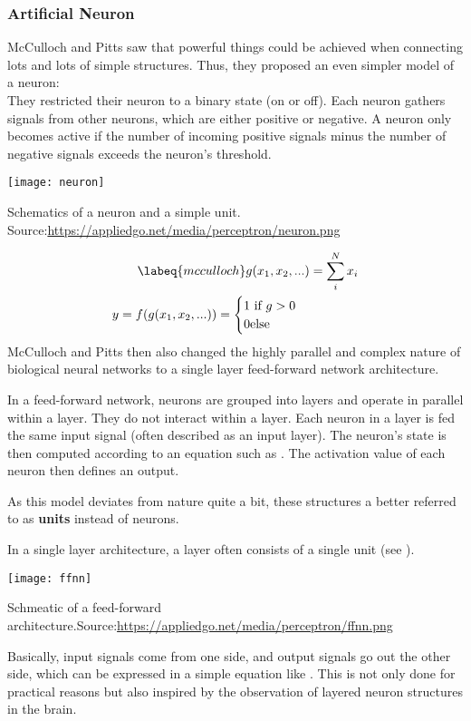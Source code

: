 \subsubsection{Artificial Neuron}
McCulloch and Pitts saw that powerful things could be achieved when connecting lots and lots of simple structures.
Thus, they proposed an even simpler model of a neuron: \\
They restricted their neuron to a binary state (on or off).
Each neuron gathers signals from other neurons, which are either positive or negative.
A neuron only becomes active if the number of incoming positive signals minus the number of negative signals exceeds the neuron's threshold.
\begin{marginfigure}
    \texttt{[image: neuron]}
    \caption{Schematics of a neuron and a simple unit. Source:\url{https://appliedgo.net/media/perceptron/neuron.png}}
\end{marginfigure}
\begin{align}
    \labeq{mcculloch}
    g(x_1, x_2, ...) & = \sum_i^N x_i \\
    y = f(g(x_1, x_2, ...)) = \begin{cases} 1 \text{ if } g > 0 \\ 0 \text{else} \end{cases}
\end{align}
McCulloch and Pitts then also changed the highly parallel and complex nature of biological neural networks to a single layer feed-forward network architecture.

In a feed-forward network, neurons are grouped into layers and operate in parallel within a layer.
They do not interact within a layer.
Each neuron in a layer is fed the same input signal (often described as an input layer).
The neuron's state is then computed according to an equation such as .
The activation value of each neuron then defines an output.

As this model deviates from nature quite a bit, these structures a better referred to as \textbf{units} instead of neurons.

In a single layer architecture, a layer often consists of a single unit (see ).
\begin{marginfigure}
    \texttt{[image: ffnn]}
    \caption{Schmeatic of a feed-forward architecture.Source:\url{https://appliedgo.net/media/perceptron/ffnn.png}}
\end{marginfigure}
Basically, input signals come from one side, and output signals go out the other side, which can be expressed in a simple equation like .
This is not only done for practical reasons but also inspired by the observation of layered neuron structures in the brain.

